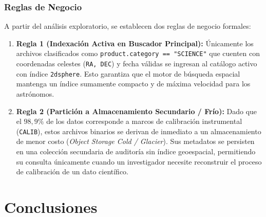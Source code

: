 \documentclass[10pt]{article}
\begin{document}
\subsubsection{Reglas de Negocio}
A partir del análisis exploratorio, se establecen dos reglas de negocio formales:
\begin{enumerate}
    \item \textbf{Regla 1 (Indexación Activa en Buscador Principal):} Únicamente los archivos clasificados como \texttt{product.category == "SCIENCE"} que cuenten con coordenadas celestes (\texttt{RA, DEC}) y fecha válidas se ingresan al catálogo activo con índice \texttt{2dsphere}. Esto garantiza que el motor de búsqueda espacial mantenga un índice sumamente compacto y de máxima velocidad para los astrónomos.
    \item \textbf{Regla 2 (Partición a Almacenamiento Secundario / Frío):} Dado que el $98,9\%$ de los datos corresponde a marcos de calibración instrumental (\texttt{CALIB}), estos archivos binarios se derivan de inmediato a un almacenamiento de menor costo (\textit{Object Storage Cold / Glacier}). Sus metadatos se persisten en una colección secundaria de auditoría sin índice geoespacial, permitiendo su consulta únicamente cuando un investigador necesite reconstruir el proceso de calibración de un dato científico.
\end{enumerate}

\section{Conclusiones}\label{sec:conclusiones}
\end{document}
